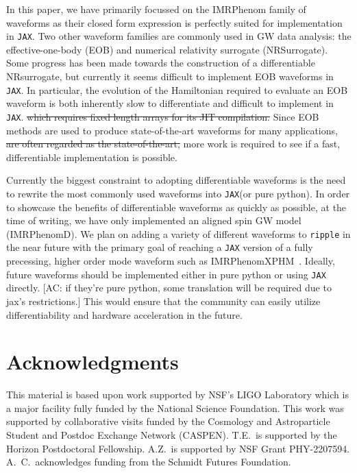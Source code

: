 \documentclass[twocolumn]{aastex631}
\newcommand{\jax}{\texttt{JAX}\xspace}
\newcommand{\ripple}{\texttt{ripple}\xspace}
\newcommand{\amc}[1]{{\color{red}[AC: #1]}}
\begin{document}
In this paper, we have primarily focussed on the IMRPhenom family of waveforms as their closed form expression is perfectly suited for implementation in \jax.
Two other waveform families are commonly used in GW data analysis: the effective-one-body (EOB) and numerical relativity surrogate (NRSurrogate). 
Some progress has been made towards the construction of a differentiable NRsurrogate, but currently it seems difficult to implement EOB waveforms in \jax.
In particular, the evolution of the Hamiltonian required to evaluate an EOB waveform is both inherently slow to differentiate and difficult to implement in \jax. 
\sout{which requires fixed length arrays for its JIT compilation.}
Since EOB methods are used to produce state-of-the-art waveforms for many applications,
\sout{are often regarded as the state-of-the-art,} 
more work is required to see if a fast, differentiable implementation is possible.

Currently the biggest constraint to adopting differentiable waveforms is the need to rewrite the most commonly used waveforms into \jax (or pure python).
In order to showcase the benefits of differentiable waveforms as quickly as possible, at the time of writing, we have only implemented an aligned spin GW model (IMRPhenomD).
We plan on adding a variety of different waveforms to \ripple in the near future with the primary goal of reaching a \jax version of a fully precessing, higher order mode waveform such as IMRPhenomXPHM~\citep{Pratten:2020ceb}.
Ideally, future waveforms should be implemented either in pure python or using \jax directly.
\amc{if they're pure python, some translation will be required due to jax's restrictions.}
This would ensure that the community can easily utilize differentiability and hardware acceleration in the future.


\section{Acknowledgments}
This material is based upon work supported by NSF's LIGO Laboratory which is a major facility fully funded by the National Science Foundation.
This work was supported by collaborative visits funded by the Cosmology and Astroparticle Student and Postdoc Exchange Network (CASPEN). 
T.E.\ is supported by the Horizon Postdoctoral Fellowship.
A.Z.~is supported by NSF Grant PHY-2207594.
A.~C.\ acknowledges funding from the Schmidt Futures Foundation.


\end{document}
